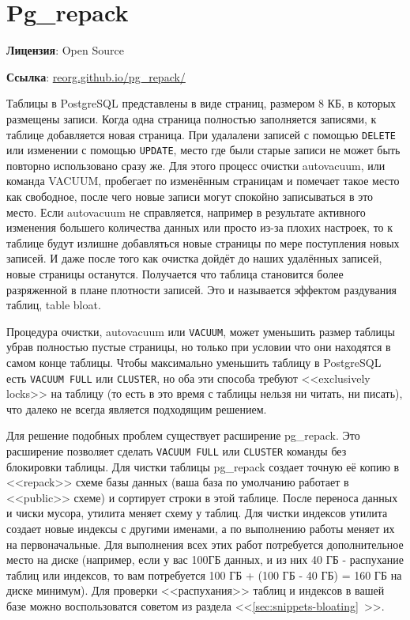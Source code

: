 \section{Pg\_repack}
\textbf{Лицензия}: Open Source

\textbf{Ссылка}: \href{http://reorg.github.io/pg\_repack/}{reorg.github.io/pg\_repack/}

Таблицы в PostgreSQL представлены в виде страниц, размером 8 КБ, в которых размещены записи. Когда одна страница полностью заполняется записями, к таблице добавляется новая страница. При удалалени записей с помощью \lstinline!DELETE! или изменении с помощью \lstinline!UPDATE!, место где были старые записи не может быть повторно использовано сразу же. Для этого процесс очистки autovacuum, или команда VACUUM, пробегает по изменённым страницам и помечает такое место как свободное, после чего новые записи могут спокойно записываться в это место. Если autovacuum не справляется, например в результате активного изменения большего количества данных или просто из-за плохих настроек, то к таблице будут излишне добавляться новые страницы по мере поступления новых записей. И даже после того как очистка дойдёт до наших удалённых записей, новые страницы останутся. Получается что таблица становится более разряженной в плане плотности записей. Это и называется эффектом раздувания таблиц, table bloat.

Процедура очистки, autovacuum или \lstinline!VACUUM!, может уменьшить размер таблицы убрав полностью пустые страницы, но только при условии что они находятся в самом конце таблицы. Чтобы максимально уменьшить таблицу в PostgreSQL есть \lstinline!VACUUM FULL! или \lstinline!CLUSTER!, но оба эти способа требуют <<exclusively locks>> на таблицу (то есть в это время с таблицы нельзя ни читать, ни писать), что далеко не всегда является подходящим решением.

Для решение подобных проблем существует расширение pg\_repack. Это расширение позволяет сделать \lstinline!VACUUM FULL! или \lstinline!CLUSTER! команды без блокировки таблицы. Для чистки таблицы pg\_repack создает точную её копию в <<repack>> схеме базы данных (ваша база по умолчанию работает в <<public>> схеме) и сортирует строки в этой таблице. После переноса данных и чиски мусора, утилита меняет схему у таблиц. Для чистки индексов утилита создает новые индексы с другими именами, а по выполнению работы меняет их на первоначальные. Для выполнения всех этих работ потребуется дополнительное место на диске (например, если у вас 100ГБ данных, и из них 40 ГБ - распухание таблиц или индексов, то вам потребуется 100 ГБ + (100 ГБ - 40 ГБ) = 160 ГБ на диске минимум). Для проверки <<распухания>> таблиц и индексов в вашей базе можно воспользоватся советом из раздела <<\ref{sec:snippets-bloating}~>>.

